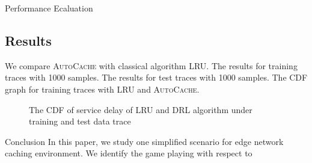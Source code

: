 \documentclass{article}
\begin{document}
\begin{section}{Performance Ecaluation}
    \subsection{Results}
    We compare \textsc{AutoCache} with classical algorithm LRU.
    The results for training traces with 1000 samples.
    The results for test traces with 1000 samples.
    The CDF graph for training traces with LRU and \textsc{AutoCache}.
    \begin{figure}[htp]
        \centering
        \hfill
        \caption{The CDF of service delay of LRU and DRL algorithm under training and test data trace}
    \end{figure}
\end{section}

\begin{section}{Conclusion}
    \label{summary}
    In this paper, we study one simplified scenario for edge network caching environment.
    We identify the game playing with respect to 
\end{section}




\end{document}
